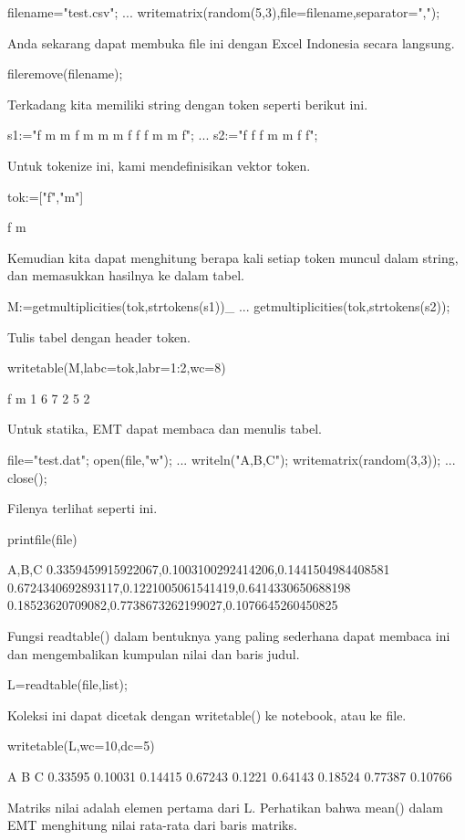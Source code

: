 \documentclass{article}
\begin{document}
\>filename="test.csv"; ...  
\>   writematrix(random(5,3),file=filename,separator=",");


Anda sekarang dapat membuka file ini dengan Excel Indonesia secara
langsung.


\>fileremove(filename);


Terkadang kita memiliki string dengan token seperti berikut ini.


\>s1:="f m m f m m m f f f m m f";  ...  
\>   s2:="f f f m m f f";


Untuk tokenize ini, kami mendefinisikan vektor token.


\>tok:=["f","m"]


    f
    m

Kemudian kita dapat menghitung berapa kali setiap token muncul dalam
string, dan memasukkan hasilnya ke dalam tabel.


\>M:=getmultiplicities(tok,strtokens(s1))\_ ...  
\>     getmultiplicities(tok,strtokens(s2));


Tulis tabel dengan header token.


\>writetable(M,labc=tok,labr=1:2,wc=8)


                   f       m
           1       6       7
           2       5       2

Untuk statika, EMT dapat membaca dan menulis tabel.


\>file="test.dat"; open(file,"w"); ...  
\>   writeln("A,B,C"); writematrix(random(3,3)); ...  
\>   close();


Filenya terlihat seperti ini.


\>printfile(file)


    A,B,C
    0.3359459915922067,0.1003100292414206,0.1441504984408581
    0.6724340692893117,0.1221005061541419,0.6414330650688198
    0.18523620709082,0.7738673262199027,0.1076645260450825
    

Fungsi readtable() dalam bentuknya yang paling sederhana dapat membaca
ini dan mengembalikan kumpulan nilai dan baris judul.


\>L=readtable(file,\>list);


Koleksi ini dapat dicetak dengan writetable() ke notebook, atau ke
file.


\>writetable(L,wc=10,dc=5)


             A         B         C
       0.33595   0.10031   0.14415
       0.67243    0.1221   0.64143
       0.18524   0.77387   0.10766

Matriks nilai adalah elemen pertama dari L. Perhatikan bahwa mean()
dalam EMT menghitung nilai rata-rata dari baris matriks.
\end{document}
